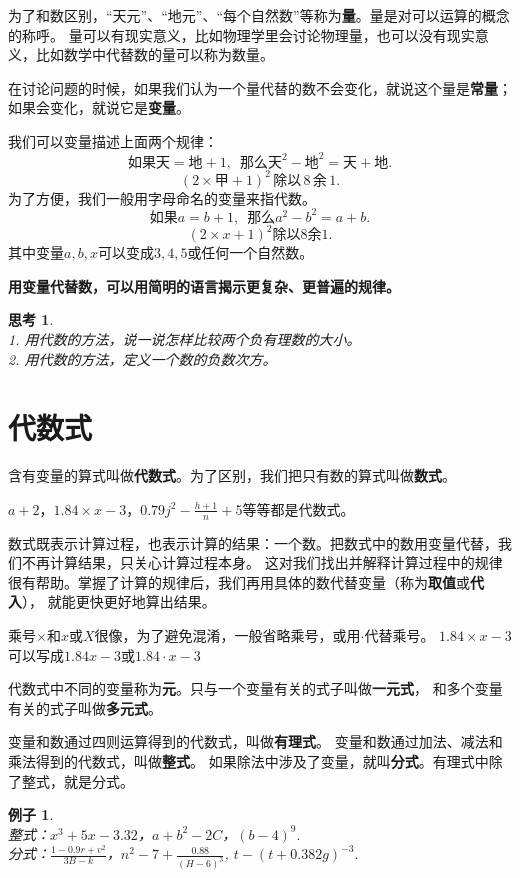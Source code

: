 \documentclass[12pt,UTF8]{ctexbook}
\newtheorem{ex}{例子}[section]
\newtheorem{sk}{思考}[section]
\begin{document}
为了和数区别，“天元”、“地元”、“每个自然数”等称为\textbf{量}。量是对可以运算的概念的称呼。
量可以有现实意义，比如物理学里会讨论物理量，也可以没有现实意义，比如数学中代替数的量可以称为数量。

在讨论问题的时候，如果我们认为一个量代替的数不会变化，就说这个量是\textbf{常量}；如果会变化，就说它是\textbf{变量}。

我们可以变量描述上面两个规律：
$$ \mbox{如果天} = \mbox{地}+1, \,\,\,\mbox{那么}\mbox{天}^2 - \mbox{地}^2 = \mbox{天} + \mbox{地}. $$
$$  (2\times \mbox{甲} + 1)^2 \,\mbox{除以} \,8\,\mbox{余}\,1.$$
为了方便，我们一般用字母命名的变量来指代数。
$$ \mbox{如果} a = b+1, \,\,\,\mbox{那么} a^2 - b^2 = a + b. $$
$$  (2\times x + 1)^2 \mbox{除以} 8\mbox{余} 1.$$
其中变量$a,b,x$可以变成$3,4,5$或任何一个自然数。

\textbf{用变量代替数，可以用简明的语言揭示更复杂、更普遍的规律。}

\begin{sk}\label{sk:1-0-0}
    \mbox{}\\
    1. 用代数的方法，说一说怎样比较两个负有理数的大小。\\
    2. 用代数的方法，定义一个数的负数次方。
\end{sk}

\section{代数式}
含有变量的算式叫做\textbf{代数式}。为了区别，我们把只有数的算式叫做\textbf{数式}。

$a + 2$，$1.84\times x - 3$，$0.79 j^2 - \frac{h+1}{n} + 5 $等等都是代数式。

数式既表示计算过程，也表示计算的结果：一个数。把数式中的数用变量代替，我们不再计算结果，只关心计算过程本身。
这对我们找出并解释计算过程中的规律很有帮助。掌握了计算的规律后，我们再用具体的数代替变量（称为\textbf{取值}或\textbf{代入}），
就能更快更好地算出结果。

乘号$\times$和$x$或$X$很像，为了避免混淆，一般省略乘号，或用$\cdot$代替乘号。
$1.84\times x - 3$可以写成$1.84 x - 3$或$1.84\cdot x - 3$

代数式中不同的变量称为\textbf{元}。只与一个变量有关的式子叫做\textbf{一元式}，
和多个变量有关的式子叫做\textbf{多元式}。

变量和数通过四则运算得到的代数式，叫做\textbf{有理式}。
变量和数通过加法、减法和乘法得到的代数式，叫做\textbf{整式}。
如果除法中涉及了变量，就叫\textbf{分式}。有理式中除了整式，就是分式。
\begin{ex}\label{ex:1-1-0}
    \mbox{} \\
    \indent 整式：$x^3 + 5x - 3.32$，$a + b^2 - 2C$，$(b - 4)^9.$ \\
    \indent 分式：$\frac{1 - 0.9r + v^2}{3B - k}$，$n^2 - 7 + \frac{0.88}{(H - 6)^3}$, $t - (t + 0.382g)^{-3}.$\\
\end{ex}
\end{document}
